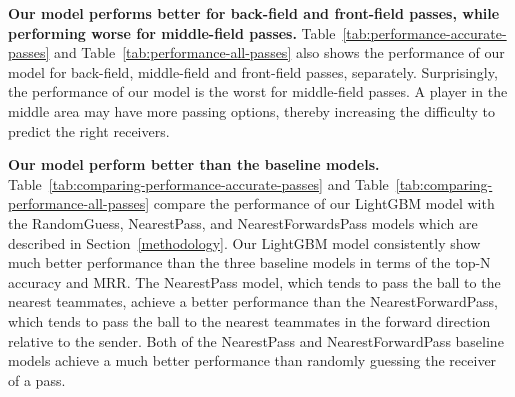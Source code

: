 \textbf{Our model performs better for back-field and front-field passes, while performing worse for middle-field passes.}
Table~\ref{tab:performance-accurate-passes} and Table~\ref{tab:performance-all-passes} also shows the performance of our model for back-field, middle-field and front-field passes, separately.
Surprisingly, the performance of our model is the worst for middle-field passes. A player in the middle area may have more passing options, thereby increasing the difficulty to predict the right receivers.

\textbf{Our model perform better than the baseline models.}
Table~\ref{tab:comparing-performance-accurate-passes} and Table~\ref{tab:comparing-performance-all-passes} compare the performance of our LightGBM model with the RandomGuess, NearestPass, and NearestForwardsPass models which are described in Section~\ref{methodology}.
Our LightGBM model consistently show much better performance than the three baseline models in terms of the top-N accuracy and MRR.
The NearestPass model, which tends to pass the ball to the nearest teammates, achieve a better performance than the NearestForwardPass, which tends to pass the ball to the nearest teammates in the forward direction relative to the sender.
Both of the NearestPass and NearestForwardPass baseline models achieve a much better performance than randomly guessing the receiver of a pass.

